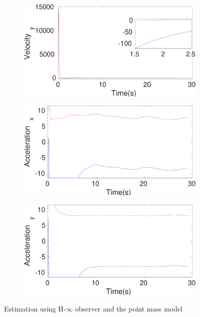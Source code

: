 \begin{figure}[!h]
\begin{subfigure}{.5\linewidth}
\end{subfigure}
\begin{subfigure}{.5\linewidth}
\centering
\includegraphics[width=\linewidth]{figures/HInf/s3pmHInfVelocity_y}
\end{subfigure}
\begin{subfigure}{.5\linewidth}
\centering
\includegraphics[width=\linewidth]{figures/HInf/s3pmHInfAcceleration_x}
\end{subfigure}
\begin{subfigure}{.5\linewidth}
\centering
\includegraphics[width=\linewidth]{figures/HInf/s3pmHInfAcceleration_y}
\end{subfigure}
\caption{Estimation using H-$\infty$ observer and the point mass model}
\end{figure}


